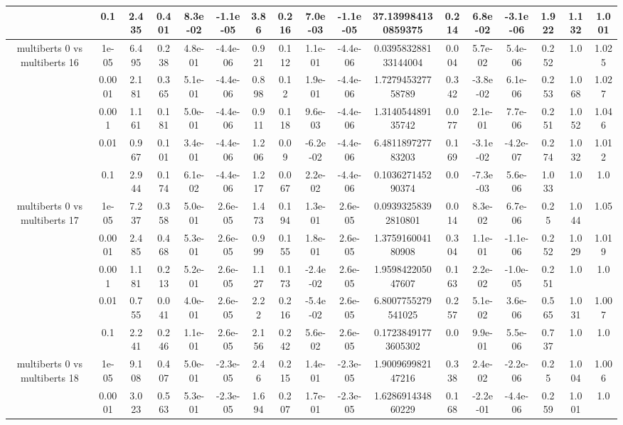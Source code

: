 \begin{tabular}{|c|c|c|c|c|c|c|c|c|c|c|c|c|c|c|c|c|}
 & 0.1 & 2.435 & 0.401 & 8.3e-02 & -1.1e-05 & 3.86 & 0.216 & 7.0e-03 & -1.1e-05 & 37.139984130859375 & 0.214 & 6.8e-02 & -3.1e-06 & 1.922 & 1.132 & 1.001 \\
\hline
\multirow{5}{*}{multiberts 0 vs multiberts 16} & 1e-05 & 6.495 & 0.238 & 4.8e-01 & -4.4e-06 & 0.921 & 0.112 & 1.1e-01 & -4.4e-06 & 0.039583288133144004 & 0.004 & 5.7e-02 & 5.4e-06 & 0.252 & 1.0 & 1.025 \\
 & 0.0001 & 2.181 & 0.365 & 5.1e-01 & -4.4e-06 & 0.898 & 0.12 & 1.9e-01 & -4.4e-06 & 1.727945327758789 & 0.342 & -3.8e-02 & 6.1e-06 & 0.253 & 1.068 & 1.027 \\
 & 0.001 & 1.161 & 0.181 & 5.0e-01 & -4.4e-06 & 0.911 & 0.118 & 9.6e-03 & -4.4e-06 & 1.314054489135742 & 0.077 & 2.1e-01 & 7.7e-06 & 0.251 & 1.052 & 1.046 \\
 & 0.01 & 0.967 & 0.101 & 3.4e-01 & -4.4e-06 & 1.206 & 0.09 & -6.2e-02 & -4.4e-06 & 6.481189727783203 & 0.169 & -3.1e-02 & -4.2e-07 & 0.274 & 1.032 & 1.012 \\
 & 0.1 & 2.944 & 0.174 & 6.1e-02 & -4.4e-06 & 1.217 & 0.067 & 2.2e-02 & -4.4e-06 & 0.103627145290374 & 0.0 & -7.3e-03 & 5.6e-06 & 1.033 & 1.0 & 1.0 \\
\hline
\multirow{5}{*}{multiberts 0 vs multiberts 17} & 1e-05 & 7.237 & 0.358 & 5.0e-01 & 2.6e-05 & 1.473 & 0.194 & 1.3e-01 & 2.6e-05 & 0.09393258392810801 & 0.014 & 8.3e-02 & 6.7e-06 & 0.25 & 1.044 & 1.05 \\
 & 0.0001 & 2.485 & 0.468 & 5.3e-01 & 2.6e-05 & 0.999 & 0.155 & 1.8e-01 & 2.6e-05 & 1.375916004180908 & 0.304 & 1.1e-01 & -1.1e-06 & 0.252 & 1.029 & 1.019 \\
 & 0.001 & 1.181 & 0.213 & 5.2e-01 & 2.6e-05 & 1.127 & 0.173 & -2.4e-02 & 2.6e-05 & 1.959842205047607 & 0.163 & 2.2e-02 & -1.0e-05 & 0.251 & 1.0 & 1.0 \\
 & 0.01 & 0.755 & 0.041 & 4.0e-01 & 2.6e-05 & 2.22 & 0.216 & -5.4e-02 & 2.6e-05 & 6.8007755279541025 & 0.257 & 5.1e-02 & 3.6e-06 & 0.565 & 1.031 & 1.007 \\
 & 0.1 & 2.241 & 0.246 & 1.1e-01 & 2.6e-05 & 2.156 & 0.242 & 5.6e-02 & 2.6e-05 & 0.17238491773605302 & 0.0 & 9.9e-01 & 5.5e-06 & 0.737 & 1.0 & 1.0 \\
\hline
\multirow{5}{*}{multiberts 0 vs multiberts 18} & 1e-05 & 9.108 & 0.407 & 5.0e-01 & -2.3e-05 & 2.46 & 0.215 & 1.4e-01 & -2.3e-05 & 1.900969982147216 & 0.338 & 2.4e-02 & -2.2e-06 & 0.25 & 1.004 & 1.006 \\
 & 0.0001 & 3.023 & 0.563 & 5.3e-01 & -2.3e-05 & 1.694 & 0.207 & 1.7e-01 & -2.3e-05 & 1.628691434860229 & 0.168 & -2.2e-01 & -4.4e-06 & 0.259 & 1.001 & 1.0 \\

\end{tabular}
